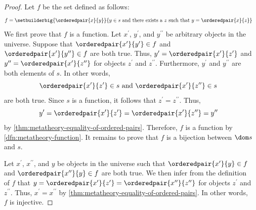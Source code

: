 \begin{proof}
    Let \( f \) be the set defined as follows:
    \begin{equation*}
        f = \setbuilderbig{\orderedpair{x}{y}}{ y \in s \ \text{and there exists a \( z \) such that \( y = \orderedpair{x}{z} \)} }
    \end{equation*}
    We first prove that \( f \) is a function.
    Let \( x^{\prime} \), \( y^{\prime} \), and \( y^{\prime\prime} \) be arbitrary objects in the universe.
    Suppose that \( \orderedpair{x^{\prime}}{y^{\prime}} \in f \) and \( \orderedpair{x^{\prime}}{y^{\prime\prime}} \in f \) are both true.
    Thus, \( y^{\prime} = \orderedpair{x^{\prime}}{z^{\prime}} \) and \( y^{\prime\prime} = \orderedpair{x^{\prime}}{z^{\prime\prime}} \)
    for objects \( z^{\prime} \) and \( z^{\prime\prime} \).
    Furthermore, \( y^{\prime} \) and \( y^{\prime\prime} \) are both elements of \( s \).
    In other words,
    \begin{equation*}
        \orderedpair{x^{\prime}}{z^{\prime}} \in s \ \text{and} \ \orderedpair{x^{\prime}}{z^{\prime\prime}} \in s
    \end{equation*}
    are both true.
    Since \( s \) is a function, it follows that \( z^{\prime} = z^{\prime\prime} \).
    Thus, 
    \begin{equation*}
        y^{\prime} = \orderedpair{x^{\prime}}{z^{\prime}} = \orderedpair{x^{\prime}}{z^{\prime\prime}} = y^{\prime\prime}
    \end{equation*}
    by \cref{thm:metatheory-equality-of-ordered-pairs}.
    Therefore, \( f \) is a function by \cref{dfn:metatheory-function}.
    It remains to prove that \( f \) is a bijection between \( \dom s \) and \( s \).
    
    \vspace{0.3cm}
    \noindent
    Let \( x^{\prime} \), \( x^{\prime\prime} \), and \( y \) be objects in the universe such that
    \( \orderedpair{x^{\prime}}{y} \in f \) and \( \orderedpair{x^{\prime\prime}}{y} \in f \) are both true.
    We then infer from the definition of \( f \) that \( y = \orderedpair{x^{\prime}}{z^{\prime}} = \orderedpair{x^{\prime\prime}}{z^{\prime\prime}} \)
    for objects \( z^{\prime} \) and \( z^{\prime\prime} \).
    Thus, \( x^{\prime} = x^{\prime\prime} \) by \cref{thm:metatheory-equality-of-ordered-pairs}.
    In other words, \( f \) is injective.


\end{proof}
